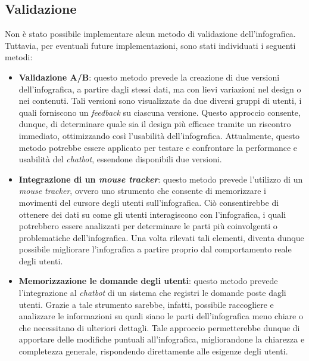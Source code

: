 \subsection{Validazione}
Non è stato possibile implementare alcun metodo di validazione dell'infografica. Tuttavia, per eventuali future implementazioni, sono stati individuati i seguenti metodi:
\begin{itemize}
    \item \textbf{Validazione A/B}: questo metodo prevede la creazione di due versioni dell'infografica, a partire dagli stessi dati, ma con lievi variazioni nel design o nei contenuti.
    Tali versioni sono visualizzate da due diversi gruppi di utenti, i quali forniscono un \emph{feedback} su ciascuna versione. 
    Questo approccio consente, dunque, di determinare quale sia il design più efficace tramite un riscontro immediato, ottimizzando così l'usabilità dell'infografica. 
    Attualmente, questo metodo potrebbe essere applicato per testare e confrontare la performance e usabilità del \emph{chatbot}, essendone disponibili due versioni.
    \item \textbf{Integrazione di un \emph{mouse tracker}}: questo metodo prevede l'utilizzo di un \emph{mouse tracker}, ovvero uno strumento che consente di memorizzare i movimenti del cursore degli utenti 
    sull'infografica. Ciò consentirebbe di ottenere dei dati su come gli utenti interagiscono con l'infografica, i quali potrebbero essere analizzati per determinare le parti più coinvolgenti o problematiche dell'infografica. 
    Una volta rilevati tali elementi, diventa dunque possibile migliorare l'infografica a partire proprio dal comportamento reale degli utenti.
    \item \textbf{Memorizzazione le domande degli utenti}: questo metodo prevede l'integrazione al \emph{chatbot} di un sistema che registri le domande poste dagli utenti.
    Grazie a tale strumento sarebbe, infatti, possibile raccogliere e analizzare le informazioni su quali siano le parti dell'infografica meno chiare o che necessitano di ulteriori dettagli. 
    Tale approccio permetterebbe dunque di apportare delle modifiche puntuali all'infografica, migliorandone la chiarezza e completezza generale, rispondendo direttamente alle esigenze degli utenti.
\end{itemize}
